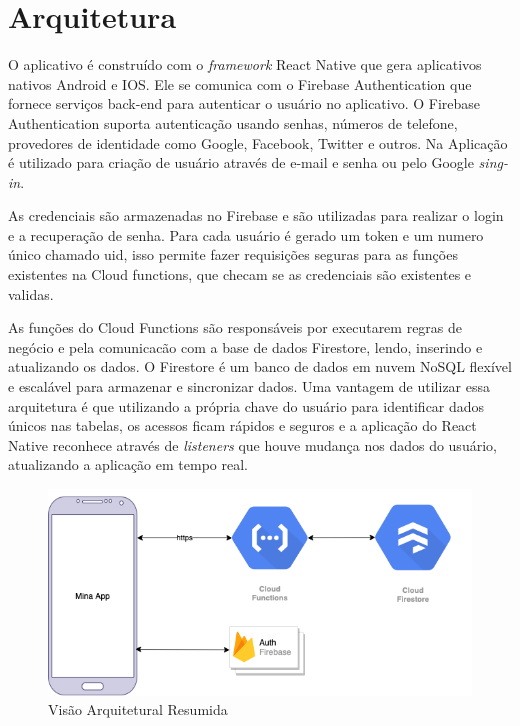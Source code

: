 \section{Arquitetura}

O aplicativo é construído com o \emph{framework} React Native que gera aplicativos nativos Android e IOS. 
Ele se comunica com o Firebase Authentication que fornece serviços back-end para autenticar 
o usuário no aplicativo. O Firebase Authentication suporta 
autenticação usando senhas, números de telefone, provedores de identidade como Google, Facebook, Twitter e 
outros. Na Aplicação é utilizado para criação de usuário através de e-mail e senha ou 
pelo Google \emph{sing-in}. 

As credenciais são armazenadas no Firebase e são utilizadas para realizar o 
login e a recuperação de senha. Para cada usuário é gerado um token e um numero único chamado uid, isso 
permite fazer requisições seguras para as funções existentes na Cloud functions, que checam se as credenciais 
são existentes e validas.

As funções do Cloud Functions são responsáveis por executarem regras de negócio e 
pela comunicacão com a base de dados Firestore, lendo, inserindo e atualizando os dados. 
O Firestore é um banco de dados em nuvem NoSQL flexível e escalável para armazenar e sincronizar dados.
Uma vantagem de utilizar essa arquitetura é que utilizando a própria chave do usuário para identificar 
dados únicos nas tabelas, os acessos ficam rápidos e seguros e a aplicação do React Native reconhece 
através de \emph{listeners} que houve mudança nos dados do usuário, atualizando a aplicação em tempo real.
 
\begin{figure}[ht]
    \centering
    \includegraphics[keepaspectratio=true,scale=0.6]{figuras/architecture.png}
    \caption{Visão Arquitetural Resumida}
        \label{fig12}
\end{figure}

